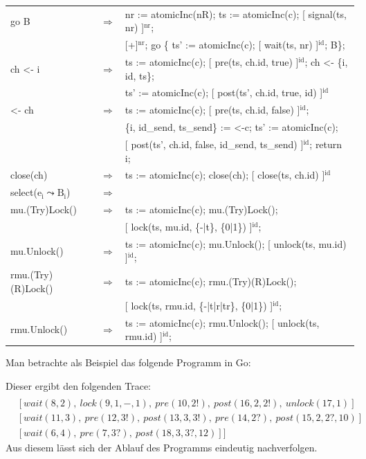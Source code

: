 \begin{tabular}{lcl}
  go B & $\Rightarrow$ & nr := atomicInc(nR); ts := atomicInc(c); [ signal(ts, nr) ]$^\text{nr}$;\\
    & & [+]$^\text{nr}$; go \{ ts' := atomicInc(c); [ wait(ts, nr) ]$^\text{id}$; B\};\\
  ch <- i & $\Rightarrow$ & ts := atomicInc(c); [ pre(ts, ch.id, true) ]$^\text{id}$; ch <- \{i, id, ts\};\\
    & & ts' := atomicInc(c); [ post(ts', ch.id, true, id) ]$^\text{id}$\\
  <- ch & $\Rightarrow$ & ts := atomicInc(c); [ pre(ts, ch.id, false) ]$^\text{id}$;\\
    & & \{i, id\_send, ts\_send\} := <-c; ts' := atomicInc(c);\\
    & & [ post(ts', ch.id, false, id\_send, ts\_send) ]$^\text{id}$; return i;\\
  close(ch) & $\Rightarrow$ & ts := atomicInc(c); close(ch); [ close(ts, ch.id) ]$^\text{id}$\\
  select(e$_\text{i} \leadsto \text{B}_\text{i}$) & $\Rightarrow$ & \\
  mu.(Try)Lock() & $\Rightarrow$ & ts := atomicInc(c); mu.(Try)Lock();\\
    & & [ lock(ts, mu.id, \{-|t\}, \{0|1\}) ]$^\text{id}$;\\
  mu.Unlock() & $\Rightarrow$ & ts := atomicInc(c); mu.Unlock(); [ unlock(ts, mu.id) ]$^\text{id}$;\\
  rmu.(Try)(R)Lock() & $\Rightarrow$ & ts := atomicInc(c); rmu.(Try)(R)Lock();\\
    & & [ lock(ts, rmu.id, \{-|t|r|tr\}, \{0|1\}) ]$^\text{id}$;\\
  rmu.Unlock() & $\Rightarrow$ & ts := atomicInc(c); rmu.Unlock(); [ unlock(ts, rmu.id) ]$^\text{id}$;
\end{tabular}



Man betrachte als Beispiel das folgende Programm in Go:

% 
Dieser ergibt den folgenden Trace:
\begin{align*}
  [&[signal(1, 2),\ signal(2, 3),\ signal(3, 4),\ pre(4, 3?, default),\ post(5, default)]\\
  &[wait(8, 2),\ lock(9, 1, -, 1),\ pre(10, 2!),\ post(16, 2, 2!),\ unlock(17, 1)]\\
  &[wait(11, 3),\ pre(12, 3!),\ post(13, 3, 3!),\ pre(14, 2?),\ post(15, 2, 2?, 10)]\\
  &[wait(6, 4),\ pre(7, 3?),\ post(18, 3, 3?, 12)]]
\end{align*}
Aus diesem lässt sich der Ablauf des Programms
eindeutig nachverfolgen.


